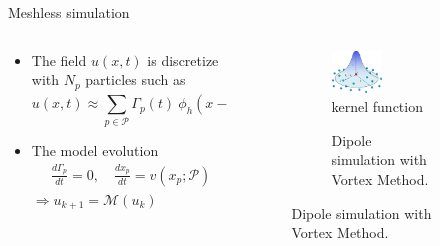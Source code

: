 \documentclass[aspectratio=169]{beamer} %
\begin{document}
\begin{frame}{Meshless simulation}
\begin{columns}[t]
\begin{column}{0.7\textwidth}
\begin{itemize}
                \item The field $u(x, t)$ is discretize with $N_p$ particles such as
                      \begin{equation*}
                          u(x, t) \approx \sum_{p \in \mathcal P} \Gamma_p(t)~\phi_h(x - x_p(t)), \quad \mathcal P = \left\{x_p, \Gamma_p\right\}_{p=1}^{N_p}
                      \end{equation*}
                \item The model evolution
                      \begin{eqnarray*}
                          \frac{d\Gamma_p}{dt} = 0, \quad \frac{d x_p}{d t} = v(x_p; \mathcal P)
                      \end{eqnarray*}
                      $\Rightarrow u_{k+1} = \mathcal M(u_{k})$
            \end{itemize}
        \end{column}
        \begin{column}{0.3\textwidth}
            \begin{figure}
                \begin{subfigure}[t]{\textwidth}
                    \centering
                    \includegraphics[width=0.5\textwidth]{images/kernel.png}
                    \caption{\tiny kernel function}
                \end{subfigure}
                \centering
                \begin{subfigure}[b]{\textwidth}
                    \centering
                    \caption{\tiny Dipole simulation with Vortex Method.}
                \end{subfigure}
            \end{figure}
        \end{column}
    \end{columns}
\end{frame}
\end{document}
